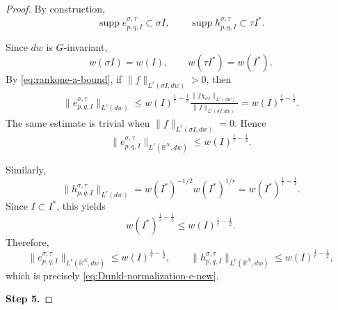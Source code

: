 \documentclass[12pt]{amsart}
\begin{document}
\begin{proof}
By construction,
\[
\operatorname{supp}e_{p,q,I}^{\sigma,\tau}
\subset\sigma I,
\qquad
\operatorname{supp}h_{p,q,I}^{\sigma,\tau}
\subset\tau I^\ast.
\]

Since $dw$ is $G$-invariant,
\[
w(\sigma I)=w(I),
\qquad
w(\tau I^\ast)=w(I^\ast).
\]
By \eqref{eq:rankone-a-bound}, if
$\|f\|_{L^r(\sigma I,dw)}>0$, then
\begin{align*}
\|e_{p,q,I}^{\sigma,\tau}\|_{L^r(dw)}
\leq
w(I)^{\frac1r-\frac12}
\frac{
\|f\chi_{\sigma I}\|_{L^r(dw)}
}{
\|f\|_{L^r(\sigma I,dw)}
}
=
w(I)^{\frac1r-\frac12}.
\end{align*}
The same estimate is trivial when
$\|f\|_{L^r(\sigma I,dw)}=0$. Hence
\[
\|e_{p,q,I}^{\sigma,\tau}\|_{L^r(\mathbb R^N,dw)}
\leq
w(I)^{\frac1r-\frac12}.
\]

Similarly,
\[
\|h_{p,q,I}^{\sigma,\tau}\|_{L^r(dw)}
=
w(I^\ast)^{-1/2}
w(I^\ast)^{1/r}
=
w(I^\ast)^{\frac1r-\frac12}.
\]
Since $I\subset I^\ast$, this yields
\[
w(I^\ast)^{\frac1r-\frac12}
\leq
w(I)^{\frac1r-\frac12}.
\]
Therefore,
\begin{equation}\label{eq:rankone-normalization-proof}
\|e_{p,q,I}^{\sigma,\tau}\|_{L^r(\mathbb R^N,dw)}
\leq
w(I)^{\frac1r-\frac12},
\qquad
\|h_{p,q,I}^{\sigma,\tau}\|_{L^r(\mathbb R^N,dw)}
\leq
w(I)^{\frac1r-\frac12},
\end{equation}
which is precisely \eqref{eq:Dunkl-normalization-e-new}.

\medskip
\noindent
\textbf{Step 5. }


\end{proof}
\end{document}
